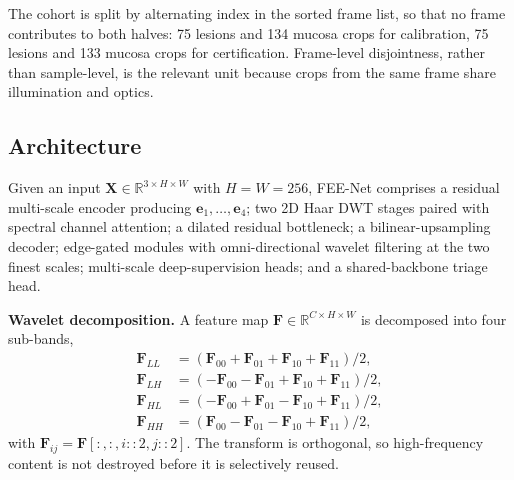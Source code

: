 \documentclass[journal]{IEEEtran}
\begin{document}
The cohort is split by alternating index in the sorted frame list, so that no frame contributes to both halves: 75 lesions and 134 mucosa crops for calibration, 75 lesions and 133 mucosa crops for certification. Frame-level disjointness, rather than sample-level, is the relevant unit because crops from the same frame share illumination and optics.

\subsection{Architecture}

Given an input $\mathbf{X}\in\mathbb{R}^{3\times H\times W}$ with $H=W=256$, FEE-Net comprises a residual multi-scale encoder producing $\mathbf{e}_1,\dots,\mathbf{e}_4$; two 2D Haar DWT stages paired with spectral channel attention; a dilated residual bottleneck; a bilinear-upsampling decoder; edge-gated modules with omni-directional wavelet filtering at the two finest scales; multi-scale deep-supervision heads; and a shared-backbone triage head.

\textbf{Wavelet decomposition.} A feature map $\mathbf{F}\in\mathbb{R}^{C\times H\times W}$ is decomposed into four sub-bands,
\begin{align}
\mathbf{F}_{LL} &= (\mathbf{F}_{00}+\mathbf{F}_{01}+\mathbf{F}_{10}+\mathbf{F}_{11})/2,\\
\mathbf{F}_{LH} &= (-\mathbf{F}_{00}-\mathbf{F}_{01}+\mathbf{F}_{10}+\mathbf{F}_{11})/2,\\
\mathbf{F}_{HL} &= (-\mathbf{F}_{00}+\mathbf{F}_{01}-\mathbf{F}_{10}+\mathbf{F}_{11})/2,\\
\mathbf{F}_{HH} &= (\mathbf{F}_{00}-\mathbf{F}_{01}-\mathbf{F}_{10}+\mathbf{F}_{11})/2,
\end{align}
with $\mathbf{F}_{ij}=\mathbf{F}[:,:,i{::}2,j{::}2]$. The transform is orthogonal, so high-frequency content is not destroyed before it is selectively reused.
\end{document}
